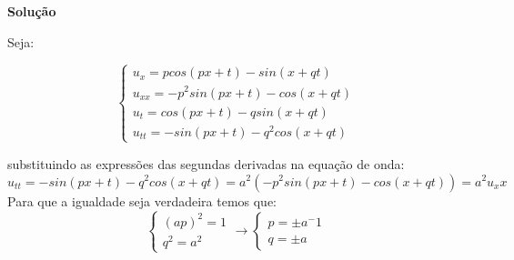 \linespread{1.5}

\textbf{Solução}

Seja:

\begin{equation*}
    \begin{cases}
    u_x = pcos(px+t)-sin(x+qt)\\
    u_{xx} = -p^2sin(px+t) - cos(x+qt)\\
    u_t = cos(px+t) - qsin(x+qt)\\
    u_{tt} = -sin(px+t) -q^2cos(x+qt)
    \end{cases}
\end{equation*}

substituindo as expressões das segundas derivadas na equação de onda:
\begin{equation*}
    u_{tt} = -sin(px+t) -q^2cos(x+qt) = a^2(-p^2sin(px+t) - cos(x+qt)) = a^2u_xx
\end{equation*}
Para que a igualdade seja verdadeira temos que:
\begin{equation*}
    \begin{cases}
    (ap)^2 = 1\\
    q^2 = a^2
    \end{cases}
    \longrightarrow
    \begin{cases}
    p = \pm a^-1\\
    q = \pm a
    \end{cases}
\end{equation*}